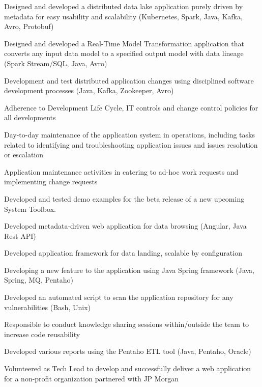 \documentclass[]{main}
\begin{document}
\begin{minipage}[t]{0.73\textwidth}
\begin{tightemize}
\item Designed and developed a distributed data lake application purely driven by metadata for easy usability and scalability (Kubernetes, Spark, Java, Kafka, Avro, Protobuf)
\item Designed and developed a Real-Time Model Transformation application that converts any input data model to a specified output model with data lineage (Spark Stream/SQL, Java, Avro) 
\item Development and test distributed application changes using disciplined software development processes (Java, Kafka, Zookeeper, Avro)
\item Adherence to Development Life Cycle, IT controls and change control policies for all developments
\item Day-to-day maintenance of the application system in operations, including tasks related to identifying and troubleshooting application issues and issues resolution or escalation
\item Application maintenance activities in catering to ad-hoc work requests and implementing change requests
\end{tightemize}
\sectionsep

\begin{tightemize}
\item Developed and tested demo examples for the beta release of a new upcoming System Toolbox. 
\item Developed metadata-driven web application for data browsing (Angular, Java Rest API)
\item Developed application framework for data landing, scalable by configuration
\item Developing a new feature to the application using Java Spring framework (Java, Spring, MQ, Pentaho)
\item Developed an automated script to scan the application repository for any vulnerabilities (Bash, Unix)
\item Responsible to conduct knowledge sharing sessions within/outside the team to increase code reusability
\item Developed various reports using the Pentaho ETL tool (Java, Pentaho, Oracle)
\item Volunteered as Tech Lead to develop and successfully deliver a web application for a non-profit organization
partnered with JP Morgan
\end{tightemize}
\sectionsep

\end{minipage} 
\end{document}
